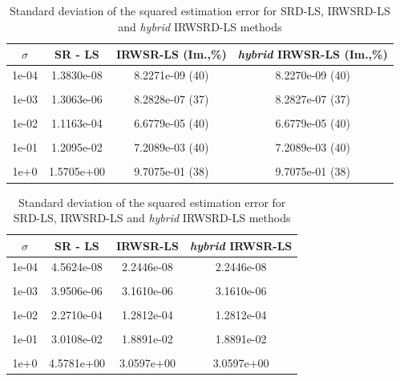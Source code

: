 \begin{table}[h]
\centering
\caption{MSE of position estimation for SRD-LS, IRWSRD-LS and \textit{hybrid} IRWSRD-LS methods}
\begin{tabular}{|c|c|c|c|} \hline
\centering
$\sigma$ & SR - LS & IRWSR-LS (Im.,\%) & \textit{hybrid} IRWSR-LS (Im.,\%) \\ \hline
1e-04& 1.3830e-08  & 8.2271e-09 (40) &  8.2270e-09 (40) \\ &&&\\ 
1e-03&	1.3063e-06  & 8.2828e-07 (37)&  8.2827e-07 (37) \\ &&&\\
1e-02&	1.1163e-04  & 6.6779e-05 (40)&  6.6779e-05 (40)  \\ &&&\\
1e-01&	1.2095e-02  & 7.2089e-03 (40)&  7.2089e-03 (40) 	 \\ &&&\\
1e+0&	1.5705e+00  & 9.7075e-01 (38)&  9.7075e-01 (38)  \\ %
\hline
\end{tabular}
\label{tab:3}

\caption{Standard deviation of the squared estimation error for SRD-LS, IRWSRD-LS and \textit{hybrid} IRWSRD-LS methods}
\begin{tabular}{|c|c|c|c|} \hline
$\sigma$ & SR - LS & IRWSR-LS & \textit{hybrid} IRWSR-LS \\ \hline
1e-04&  4.5624e-08 &   2.2446e-08 &  2.2446e-08\\ &&&\\
1e-03&	3.9506e-06 &   3.1610e-06 &  3.1610e-06\\ &&&\\
1e-02&	2.2710e-04 &   1.2812e-04 &  1.2812e-04\\ &&&\\
1e-01&	3.0108e-02 &   1.8891e-02 &  1.8891e-02\\ &&&\\
1e+0&	4.5781e+00 &   3.0597e+00 &  3.0597e+00\\ %
\hline
\end{tabular}
\label{tab:4}
\end{table}

